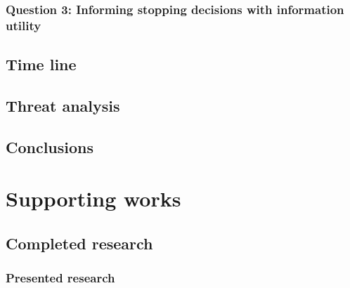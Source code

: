 \documentclass[10pt,oneside]{book}
\begin{document}
\newpage

\subsection{Question 3: Informing stopping decisions with information utility}


\section{Time line}
\section{Threat analysis}
\section{Conclusions}


\chapter{Supporting works}
\section{Completed research}

\subsection{Presented research}
\end{document}
